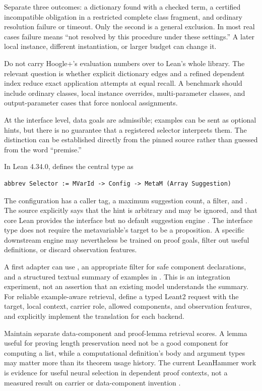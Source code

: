 Separate three outcomes: a dictionary found with a checked term, a certified incompatible obligation in a restricted complete class fragment, and ordinary resolution failure or timeout. Only the second is a general exclusion. In most real cases failure means ``not resolved by this procedure under these settings.'' A later local instance, different instantiation, or larger budget can change it.

Do not carry Hoogle+'s evaluation numbers over to Lean's whole library. The relevant question is whether explicit dictionary edges and a refined dependent index reduce exact application attempts at equal recall. A benchmark should include ordinary classes, local instance overrides, multi-parameter classes, and output-parameter cases that force nonlocal assignments.

\ans At the interface level, data goals are admissible; examples can be sent as optional hints, but there is no guarantee that a registered selector interprets them. The distinction can be established directly from the pinned source rather than guessed from the word ``premise.''

In Lean 4.34.0,  defines the central type as
\begin{lstlisting}
abbrev Selector := MVarId -> Config -> MetaM (Array Suggestion)
\end{lstlisting}
The configuration has a caller tag, a maximum suggestion count, a filter, and . The source explicitly says that the hint is arbitrary and may be ignored, and that core Lean provides the interface but no default suggestion engine \cite{leanlibrary}. The interface type does not require the metavariable's target to be a proposition. A specific downstream engine may nevertheless be trained on proof goals, filter out useful definitions, or discard observation features.

A first adapter can use , an appropriate filter for safe component declarations, and a structured textual summary of examples in . This is an integration experiment, not an assertion that an existing model understands the summary. For reliable example-aware retrieval, define a typed Leant2 request with the target, local context, carrier role, allowed components, and observation features, and explicitly implement the translation for each backend.

Maintain separate data-component and proof-lemma retrieval scores. A lemma useful for proving length preservation need not be a good component for computing a list, while a computational definition's body and argument types may matter more than its theorem usage history. The current LeanHammer work is evidence for useful neural selection in dependent proof contexts, not a measured result on carrier or data-component invention \cite{leanhammer}.


